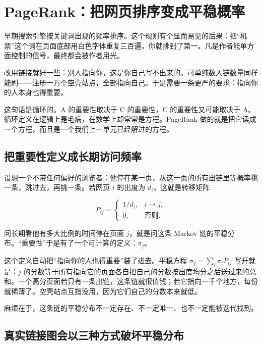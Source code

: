 \section{PageRank：把网页排序变成平稳概率}
\label{sec:06-Random-Processes/04-Applications/03}

早期搜索引擎按关键词出现的频率排序。这个规则有个显而易见的后果：把``机票''这个词在页面底部用白色字体重复三百遍，你就排到了第一。凡是作者能单方面控制的信号，最终都会被作者用光。

改用链接就好一些：别人指向你，这是你自己写不出来的。可单纯数入链数量同样能刷——注册一万个空壳站点，全部指向自己。于是需要一条更严的要求：指向你的人本身也得重要。

这句话是循环的。A 的重要性取决于 C 的重要性，C 的重要性又可能取决于 A。循环定义在逻辑上是毛病，在数学上却常常是方程。PageRank 做的就是把它读成一个方程，而且是一个我们上一单元已经解过的方程。

\subsection{把重要性定义成长期访问频率}

设想一个不带任何偏好的浏览者：他停在某一页，从这一页的所有出链里等概率挑一条，跳过去，再挑一条。若网页 \(i\) 的出度为 \(d_i\)，这就是转移矩阵

\[
P_{ij}=\begin{cases}1/d_i,&i\to j,\\[2pt]0,&\text{否则}.\end{cases}
\]

问长期看他有多大比例的时间停在页面 \(j\)，就是问这条 Markov 链的平稳分布。``重要性''于是有了一个可计算的定义：\(\pi_j\)。

这个定义自动把``指向你的人也得重要''装了进去。平稳方程 \(\pi_j=\sum_i\pi_iP_{ij}\) 写开就是：\(j\) 的分数等于所有指向它的页面各自把自己的分数按出度均分之后送过来的总和。一个高分页面若只有一条出链，这条链就很值钱；若它指向一千个地方，每份就稀薄了。空壳站点互指没用，因为它们自己的分数本来就低。

麻烦在于，这条链的平稳分布不一定存在、不一定唯一、也不一定能被迭代找到。

\subsection{真实链接图会以三种方式破坏平稳分布}

